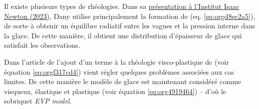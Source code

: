 \documentclass[10pt]{article}
\numberwithin{equation}{section}
\begin{document}
Il existe plusieurs types de rhéologies.
Dans sa \href{https://www.youtube.com/watch?v=\_V7ozTp6SJM}{présentation à l'Institut Isaac Newton (2023)}, Dany utilise principalement la formation de \Textcite{hibler1979dynamic} (eq. \ref{eq:orgd8ec2a5}), de sorte à obtenir un équilibre radiatif entre les vagues et la pression interne dans la glace.
De cette manière, il obtient une distribution d'épaisseur de glace qui satisfait les observations.\medskip

Dans l'article de \Textcite{hunke1997elastic}  l'ajout d'un terme à la rhéologie visco-plastique de \Textcite{hibler1979dynamic} (voir équation \ref{eq:orgf317cd4}) vient régler quelques problèmes associées aux cas limites.
De cette manière le modèle de glace est maintenant considéré comme visqueux, élastique et plastique (voir équation \ref{eq:org4919464}) -- d'où le sobriquet \emph{EVP model}.



\printbibliography
\end{document}
